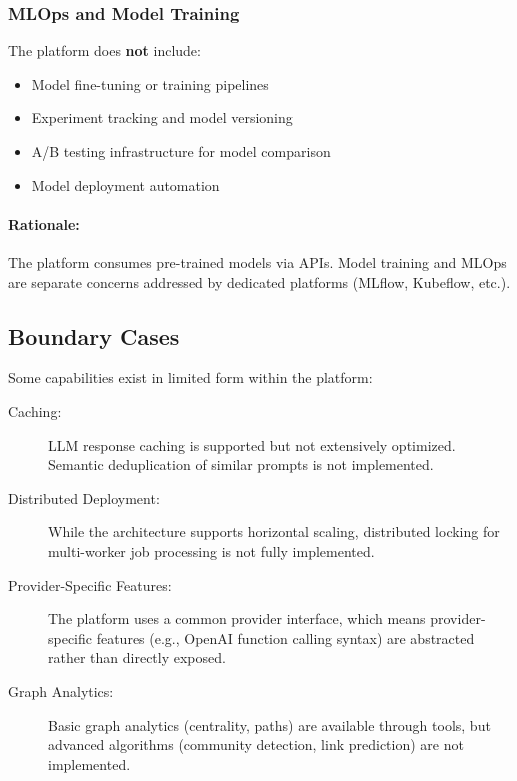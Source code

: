 \documentclass[a4paper,twoside]{sapthesis}
\begin{document}
\subsubsection{MLOps and Model Training}

The platform does \textbf{not} include:

\begin{itemize}
    \item Model fine-tuning or training pipelines
    \item Experiment tracking and model versioning
    \item A/B testing infrastructure for model comparison
    \item Model deployment automation
\end{itemize}

\paragraph{Rationale:} The platform consumes pre-trained models via APIs. Model training and MLOps are separate concerns addressed by dedicated platforms (MLflow, Kubeflow, etc.).

\subsection{Boundary Cases}

Some capabilities exist in limited form within the platform:

\begin{description}
    \item[Caching:] LLM response caching is supported but not extensively optimized. Semantic deduplication of similar prompts is not implemented.
    
    \item[Distributed Deployment:] While the architecture supports horizontal scaling, distributed locking for multi-worker job processing is not fully implemented.
    
    \item[Provider-Specific Features:] The platform uses a common provider interface, which means provider-specific features (e.g., OpenAI function calling syntax) are abstracted rather than directly exposed.
    
    \item[Graph Analytics:] Basic graph analytics (centrality, paths) are available through tools, but advanced algorithms (community detection, link prediction) are not implemented.
\end{description}
\end{document}
